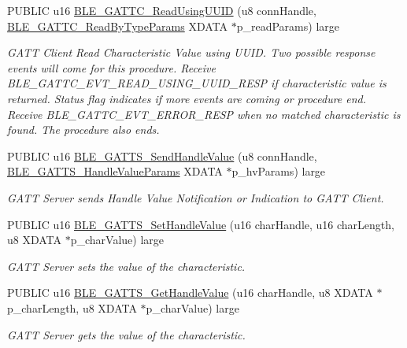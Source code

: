 \begin{DoxyCompactItemize}
P\+U\+B\+L\+IC u16 \hyperlink{group___b_l_e___g_a_t_t_gaadbfe9bd310f779cfb924e7fb5a47c90}{B\+L\+E\+\_\+\+G\+A\+T\+T\+C\+\_\+\+Read\+Using\+U\+U\+ID} (u8 conn\+Handle, \hyperlink{struct_b_l_e___g_a_t_t_c___read_by_type_params}{B\+L\+E\+\_\+\+G\+A\+T\+T\+C\+\_\+\+Read\+By\+Type\+Params} X\+D\+A\+TA $\ast$p\+\_\+read\+Params) large
\begin{DoxyCompactList}\small\item\em G\+A\+TT Client Read Characteristic Value using U\+U\+ID. Two possible response events will come for this procedure. Receive B\+L\+E\+\_\+\+G\+A\+T\+T\+C\+\_\+\+E\+V\+T\+\_\+\+R\+E\+A\+D\+\_\+\+U\+S\+I\+N\+G\+\_\+\+U\+U\+I\+D\+\_\+\+R\+E\+SP if characteristic value is returned. Status flag indicates if more events are coming or procedure end. Receive B\+L\+E\+\_\+\+G\+A\+T\+T\+C\+\_\+\+E\+V\+T\+\_\+\+E\+R\+R\+O\+R\+\_\+\+R\+E\+SP when no matched characteristic is found. The procedure also ends. \end{DoxyCompactList}\item 
P\+U\+B\+L\+IC u16 \hyperlink{group___b_l_e___g_a_t_t_gaafd2594c3671e138de2461b07bab346e}{B\+L\+E\+\_\+\+G\+A\+T\+T\+S\+\_\+\+Send\+Handle\+Value} (u8 conn\+Handle, \hyperlink{struct_b_l_e___g_a_t_t_s___handle_value_params}{B\+L\+E\+\_\+\+G\+A\+T\+T\+S\+\_\+\+Handle\+Value\+Params} X\+D\+A\+TA $\ast$p\+\_\+hv\+Params) large
\begin{DoxyCompactList}\small\item\em G\+A\+TT Server sends Handle Value Notification or Indication to G\+A\+TT Client. \end{DoxyCompactList}\item 
P\+U\+B\+L\+IC u16 \hyperlink{group___b_l_e___g_a_t_t_ga5ac5fbf3af34caa031cdb4102f2dec7c}{B\+L\+E\+\_\+\+G\+A\+T\+T\+S\+\_\+\+Set\+Handle\+Value} (u16 char\+Handle, u16 char\+Length, u8 X\+D\+A\+TA $\ast$p\+\_\+char\+Value) large
\begin{DoxyCompactList}\small\item\em G\+A\+TT Server sets the value of the characteristic. \end{DoxyCompactList}\item 
P\+U\+B\+L\+IC u16 \hyperlink{group___b_l_e___g_a_t_t_gaf3d67205f8113c1bed597881ef303817}{B\+L\+E\+\_\+\+G\+A\+T\+T\+S\+\_\+\+Get\+Handle\+Value} (u16 char\+Handle, u8 X\+D\+A\+TA $\ast$p\+\_\+char\+Length, u8 X\+D\+A\+TA $\ast$p\+\_\+char\+Value) large
\begin{DoxyCompactList}\small\item\em G\+A\+TT Server gets the value of the characteristic. \end{DoxyCompactList}\item 

\end{DoxyCompactItemize}
